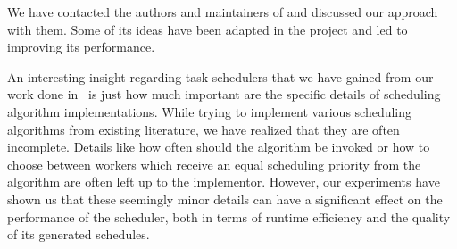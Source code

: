 We have contacted the authors and maintainers of \dask{} and discussed our
\rsds{} approach with
them. Some of its ideas have been
adapted in the \dask{} project and led to improving its performance.

An interesting insight regarding task schedulers that we have gained from our work done
in~\cite{estee,rsds} is just how much important are the specific details of scheduling
algorithm implementations. While trying to implement various scheduling algorithms from existing
literature, we have realized that they are often incomplete. Details like how often should the
algorithm be invoked or how to choose between workers which receive an equal scheduling priority
from the algorithm are often left up to the implementor. However, our experiments have shown us
that these seemingly minor details can have a significant effect on the performance of the
scheduler, both in terms of runtime efficiency and the quality of its generated schedules.
